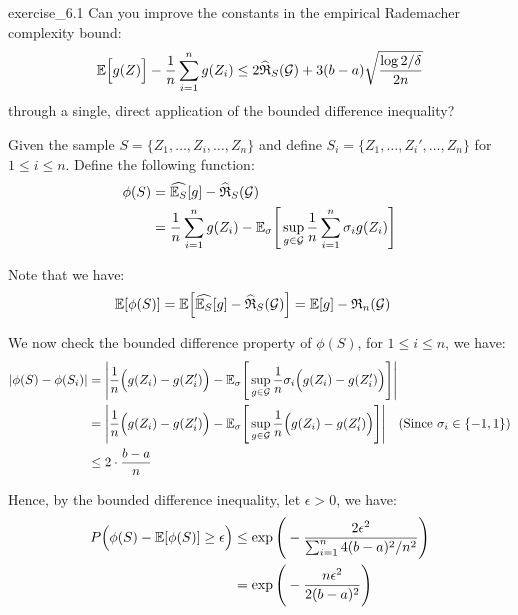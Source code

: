 \begin{exercise}{}{exercise_6.1}
    Can you improve the constants in the empirical Rademacher complexity bound:
    \begin{align*}
        \mathbb{E}\Big[ g(Z) \Big] - \frac{1}{n}\sum_{i=1}^n g(Z_i) \le 2\widehat{\mathfrak{R}}_S(\mathcal{G}) + 3(b-a)\sqrt{
            \frac{\log 2/\delta}{2n}
        }
    \end{align*}
    \noindent through a single, direct application of the bounded diﬀerence inequality?
\end{exercise}

\begin{solution*}
    Given the sample $S=\{Z_1, \dots, Z_i, \dots, Z_n \}$ and define $S_i = \{Z_1, \dots, Z_i', \dots, Z_n \}$ for $1\le i \le n$. Define the following function:
    \begin{align*}
        \phi(S) &= \widehat{\mathbb{E}_S}[g] - \widehat{\mathfrak{R}}_S(\mathcal{G}) \\
            &= \frac{1}{n}\sum_{i=1}^n g(Z_i) - \mathbb{E}_\sigma\Bigg[ 
                \sup_{g\in\mathcal{G}}\frac{1}{n} \sum_{i=1}^n \sigma_i g(Z_i)
             \Bigg]
    \end{align*}

    \noindent Note that we have:
    \begin{align*}
        \mathbb{E}[\phi(S)] &= \mathbb{E}\Big[ 
            \widehat{\mathbb{E}_S}[g] - \widehat{\mathfrak{R}}_S(\mathcal{G})
         \Big] = \mathbb{E}[g] - \mathfrak{R}_n(\mathcal{G})
    \end{align*}

    \noindent We now check the bounded difference property of $\phi(S)$, for $1\le i \le n$, we have:
    \begin{align*}
        |\phi(S) - \phi(S_i)| &= \Bigg| 
            \frac{1}{n}\Big( g(Z_i) - g(Z_i') \Big) - \mathbb{E}_\sigma\Bigg[ 
                \sup_{g\in\mathcal{G}} \frac{1}{n}\sigma_i\Big( g(Z_i) - g(Z_i') \Big)
             \Bigg]
         \Bigg| \\
        &= \Bigg| 
            \frac{1}{n}\Big( g(Z_i) - g(Z_i') \Big) - \mathbb{E}_\sigma\Bigg[ 
                \sup_{g\in\mathcal{G}} \frac{1}{n}\Big( g(Z_i) - g(Z_i') \Big)
             \Bigg]
         \Bigg| \ \ \ (\text{Since $\sigma_i\in\{-1, 1\}$}) \\
        &\le 2\cdot\frac{b-a}{n}
    \end{align*}

    \noindent Hence, by the bounded difference inequality, let $\epsilon > 0$, we have:
    \begin{align*}
        P\Big( 
            \phi(S) - \mathbb{E}[\phi(S)] \ge \epsilon
         \Big) &\le \exp\Bigg( 
            -\frac{2\epsilon^2}{\sum_{i=1}^n 4(b-a)^2/n^2}
         \Bigg) \\
        &= \exp\Bigg( 
            -\frac{n\epsilon^2}{2(b-a)^2}
         \Bigg)
    \end{align*}


\end{solution*}
